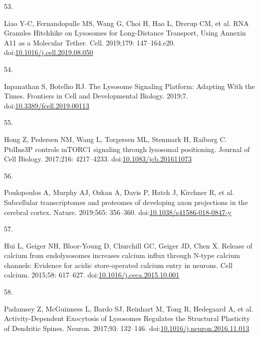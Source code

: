 \documentclass[
  12pt,
  a4paper,
]{book}
\newlength{\cslhangindent}
\newlength{\csllabelwidth}
\newlength{\cslentryspacingunit} %
\newenvironment{CSLReferences}[2] %
 {%
  \setlength{\parindent}{0pt}
  \ifodd #1
  \let\oldpar\par
  \def\par{\hangindent=\cslhangindent\oldpar}
  \fi
  \setlength{\parskip}{#2\cslentryspacingunit}
 }%
 {}
\newcommand{\CSLLeftMargin}[1]{\parbox[t]{\csllabelwidth}{#1}}
\newcommand{\CSLRightInline}[1]{\parbox[t]{\linewidth - \csllabelwidth}{#1}\break}
\begin{document}
\begin{CSLReferences}{0}{0}
\leavevmode{}%
\CSLLeftMargin{53. }%
\CSLRightInline{Liao Y-C, Fernandopulle MS, Wang G, Choi H, Hao L, Drerup CM, et al. {RNA Granules Hitchhike} on {Lysosomes} for {Long-Distance Transport}, {Using Annexin A11} as a {Molecular Tether}. Cell. 2019;179: 147--164.e20. doi:\href{https://doi.org/10.1016/j.cell.2019.08.050}{10.1016/j.cell.2019.08.050}}

\leavevmode{}%
\CSLLeftMargin{54. }%
\CSLRightInline{Inpanathan S, Botelho RJ. The {Lysosome Signaling Platform}: {Adapting With} the {Times}. Frontiers in Cell and Developmental Biology. 2019;7. doi:\href{https://doi.org/10.3389/fcell.2019.00113}{10.3389/fcell.2019.00113}}

\leavevmode{}%
\CSLLeftMargin{55. }%
\CSLRightInline{Hong Z, Pedersen NM, Wang L, Torgersen ML, Stenmark H, Raiborg C. {PtdIns3P} controls {mTORC1} signaling through lysosomal positioning. Journal of Cell Biology. 2017;216: 4217--4233. doi:\href{https://doi.org/10.1083/jcb.201611073}{10.1083/jcb.201611073}}

\leavevmode{}%
\CSLLeftMargin{56. }%
\CSLRightInline{Poulopoulos A, Murphy AJ, Ozkan A, Davis P, Hatch J, Kirchner R, et al. Subcellular transcriptomes and proteomes of developing axon projections in the cerebral cortex. Nature. 2019;565: 356--360. doi:\href{https://doi.org/10.1038/s41586-018-0847-y}{10.1038/s41586-018-0847-y}}

\leavevmode{}%
\CSLLeftMargin{57. }%
\CSLRightInline{Hui L, Geiger NH, Bloor-Young D, Churchill GC, Geiger JD, Chen X. Release of calcium from endolysosomes increases calcium influx through {N-type} calcium channels: {Evidence} for acidic store-operated calcium entry in neurons. Cell calcium. 2015;58: 617--627. doi:\href{https://doi.org/10.1016/j.ceca.2015.10.001}{10.1016/j.ceca.2015.10.001}}

\leavevmode{}%
\CSLLeftMargin{58. }%
\CSLRightInline{Padamsey Z, McGuinness L, Bardo SJ, Reinhart M, Tong R, Hedegaard A, et al. Activity-{Dependent Exocytosis} of {Lysosomes Regulates} the {Structural Plasticity} of {Dendritic Spines}. Neuron. 2017;93: 132--146. doi:\href{https://doi.org/10.1016/j.neuron.2016.11.013}{10.1016/j.neuron.2016.11.013}}


\end{CSLReferences}
\end{document}
